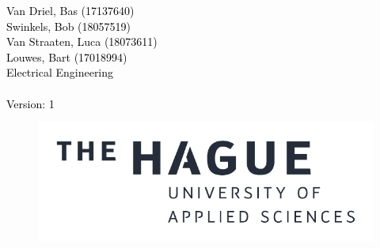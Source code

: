 \begin{titlepage}
\begin{flushleft}
        \Large
        \hspace{\kantlinebreedte}
        \textcolor{black}{Van Driel, Bas (17137640)\\}
        \hspace{\kantlinebreedte}
        \textcolor{black}{Swinkels, Bob (18057519)\\}
        \hspace{\kantlinebreedte}
        \textcolor{black}{Van Straaten, Luca (18073611)\\}
        \hspace{\kantlinebreedte}
        \textcolor{black}{Louwes, Bart (17018994)\\}
        \hspace{\kantlinebreedte}
        \textcolor{black}{Electrical Engineering\\}
        \hspace{\kantlinebreedte}
        \textcolor{black}{\dedatum \\}
        \hspace{\kantlinebreedte}
        \textcolor{black}{Version: 1}
        
        
        \vspace{0.1cm}
        
        \begin{figure}
        \centering
        \includegraphics[right]{cover/logo_black.pdf}
        \end{figure}
        
        
        \end{flushleft}






\end{titlepage}